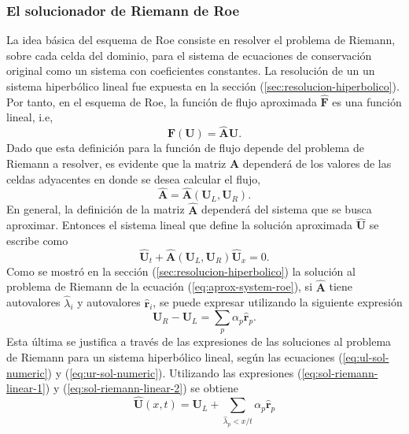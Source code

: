 \subsubsection{El solucionador de Riemann de Roe}
La idea básica del esquema de Roe consiste en resolver el problema de Riemann, sobre cada celda del dominio, para el sistema de ecuaciones de conservación original como un sistema con coeficientes constantes. La resolución de un un sistema hiperbólico lineal fue expuesta en la sección (\ref{sec:resolucion-hiperbolico}). Por tanto, en el esquema de Roe, la función de flujo aproximada $\mathbf{\hat{F}}$ es una función lineal, i.e, 
\begin{equation}
	\mathbf{\hat{F}}(\mathbf{U}) = \mathbf{\hat{A}}\mathbf{U}.
	\label{eq:aprox-flux-roe}
\end{equation}
Dado que esta definición para la función de flujo depende del problema de Riemann a resolver, es evidente que la matriz $\mathbf{\hat{A}}$ dependerá de los valores de las celdas adyacentes en donde se desea calcular el flujo,
\begin{equation}
	\mathbf{\hat{A}} = \mathbf{\hat{A}}(\mathbf{U}_L, \mathbf{U}_R).
\end{equation}
En general, la definición de la matriz $\mathbf{\hat{A}}$ dependerá del sistema que se busca aproximar. Entonces el sistema lineal que define la solución aproximada $\mathbf{\hat{U}}$ se escribe como
\begin{equation}
	\mathbf{\hat{U}}_t + \mathbf{\hat{A}}(\mathbf{U}_L, \mathbf{U}_R)\mathbf{\hat{U}}_x = 0.
	\label{eq:aprox-system-roe}
\end{equation}
Como se mostró en la sección (\ref{sec:resolucion-hiperbolico}) la solución al problema de Riemann de la ecuación (\ref{eq:aprox-system-roe}), si $\mathbf{\hat{A}}$ tiene autovalores $\hat{\lambda}_i$ y autovalores $\mathbf{\hat{r}}_{i}$, se puede expresar utilizando la siguiente expresión
\begin{equation}
	\mathbf{U}_R - \mathbf{U}_L = \sum_{p} {\alpha}_p \mathbf{\hat{r}}_{p}.
\end{equation}
Esta última se justifica a través de las expresiones de las soluciones al problema de Riemann para un sistema hiperbólico lineal, según las ecuaciones (\ref{eq:ul-sol-numeric}) y (\ref{eq:ur-sol-numeric}). Utilizando las expresiones (\ref{eq:sol-riemann-linear-1}) y (\ref{eq:sol-riemann-linear-2}) se obtiene
\begin{equation}
	\mathbf{\hat{U}} (x,t) = \mathbf{U}_L + \sum_{\hat{\lambda}_{p}<x/t}\alpha_{p}\mathbf{\hat{r}}_{p}
\end{equation}

